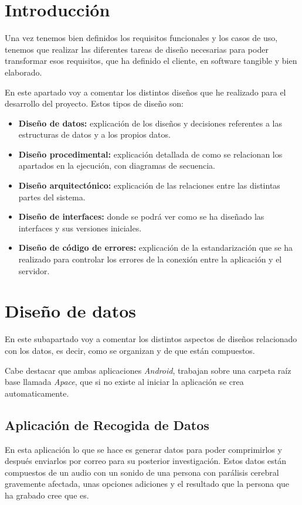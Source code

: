 
\section{Introducción}
Una vez tenemos bien definidos los requisitos funcionales y los casos de uso, tenemos que realizar las diferentes tareas de diseño necesarias para poder transformar esos requisitos, que ha definido el cliente, en software tangible y bien elaborado.

En este apartado voy a comentar los distintos diseños que he realizado para el desarrollo del proyecto. Estos tipos de diseño son:
\begin{itemize}
	\item \textbf{Diseño de datos:} explicación de los diseños y decisiones referentes a las estructuras de datos y a los propios datos.
	\item \textbf{Diseño procedimental:} explicación detallada de como se relacionan los apartados en la ejecución, con diagramas de secuencia.
	\item \textbf{Diseño arquitectónico:} explicación de las relaciones entre las distintas partes del sistema.
	\item \textbf{Diseño de interfaces:} donde se podrá ver como se ha diseñado las interfaces y sus versiones iniciales.
	\item \textbf{Diseño de código de errores:} explicación de la estandarización que se ha realizado para controlar los errores de la conexión entre la aplicación y el servidor.
\end{itemize}
\section{Diseño de datos}
En este subapartado voy a comentar los distintos aspectos de diseños relacionado con los datos, es decir, como se organizan y de que están compuestos.

Cabe destacar que ambas aplicaciones \textit{Android}, trabajan sobre una carpeta raíz base llamada \textit{Apace}, que si no existe al iniciar la aplicación se crea automaticamente.

\subsection{Aplicación de Recogida de Datos}
En esta aplicación lo que se hace es generar datos para poder comprimirlos y después enviarlos por correo para su posterior investigación. Estos datos están compuestos de un audio con un sonido de una persona con parálisis cerebral gravemente afectada, unas opciones adiciones y el resultado que la persona que ha grabado cree que es.

